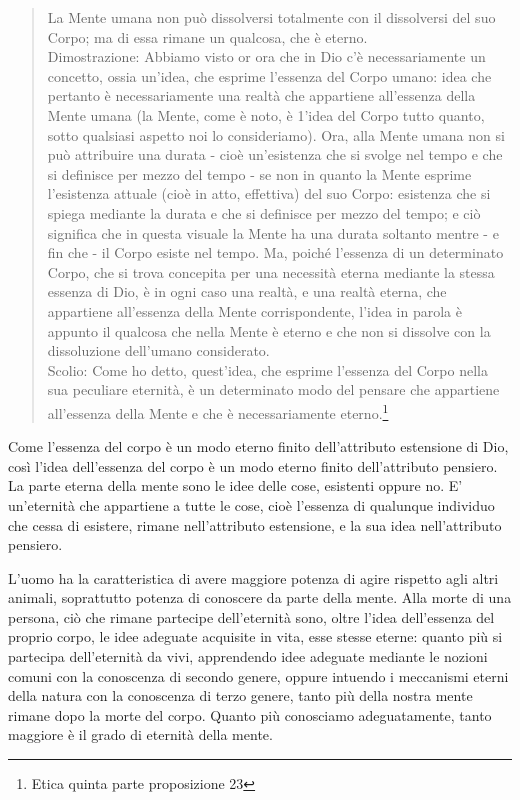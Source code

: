 \begin{quotation}
	\small La Mente umana non può dissolversi totalmente con il dissolversi del suo Corpo; ma di essa rimane un qualcosa, che è eterno.\\
	Dimostrazione: Abbiamo visto or ora che in Dio c’è necessariamente un concetto, ossia
	un’idea, che esprime l’essenza del Corpo umano: idea che pertanto è necessariamente una
	realtà che appartiene all’essenza della Mente umana (la Mente, come è noto, è 1’idea del
	Corpo tutto quanto, sotto qualsiasi aspetto noi lo consideriamo). Ora, alla Mente umana
	non si può attribuire una durata - cioè un’esistenza che si svolge nel tempo e che si definisce per mezzo del tempo - se non in quanto la Mente esprime l’esistenza attuale (cioè in atto, effettiva) del suo Corpo: esistenza che si spiega mediante la durata e che si definisce per
	mezzo del tempo; e ciò significa che in questa visuale la Mente ha una durata soltanto mentre - e fin che - il Corpo esiste nel tempo. Ma, poiché l’essenza di un determinato Corpo,
	che si trova concepita per una necessità eterna mediante la stessa essenza di Dio, è in ogni
	caso una realtà, e una realtà eterna, che appartiene all’essenza della Mente corrispondente, l’idea in parola è appunto il qualcosa che nella Mente è eterno e che non si dissolve con
	la dissoluzione dell’umano considerato.\\
	Scolio: Come ho detto, quest’idea, che esprime l’essenza del Corpo nella sua peculiare eternità, è un determinato modo del pensare che appartiene all’essenza della Mente e
	che è necessariamente eterno.\footnote{Etica quinta parte proposizione 23}
\end{quotation}

Come l'essenza del corpo è un modo eterno finito dell'attributo estensione di Dio, così l'idea dell'essenza del corpo è un modo eterno finito dell'attributo pensiero. La parte eterna della mente sono le idee delle cose, esistenti oppure no. E' un'eternità che appartiene a tutte le cose, cioè l'essenza di qualunque individuo che cessa di esistere, rimane nell'attributo estensione, e la sua idea nell'attributo pensiero.


L'uomo ha la caratteristica di avere maggiore potenza di agire rispetto agli altri animali, soprattutto potenza di conoscere da parte della mente. Alla morte di una persona, ciò che rimane partecipe dell'eternità sono, oltre l'idea dell'essenza del proprio corpo, le idee adeguate acquisite in vita, esse stesse eterne: quanto più si partecipa dell'eternità da vivi, apprendendo idee adeguate mediante le nozioni comuni con la conoscenza di secondo genere, oppure intuendo i meccanismi eterni della natura con la conoscenza di terzo genere, tanto più della nostra mente rimane dopo la morte del corpo. Quanto più conosciamo adeguatamente, tanto maggiore è il grado di eternità della mente.

